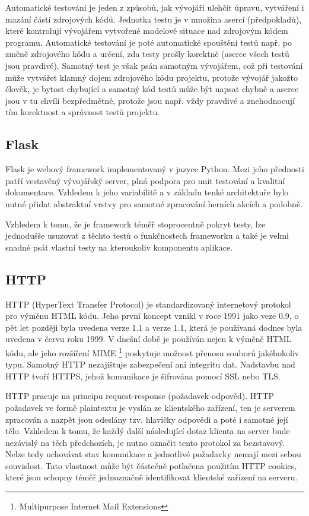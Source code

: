 \documentclass[16pt,titlepage,a4paper]{article}
\begin{document}
Automatické testování je jeden z způsobů, jak vývojáři ulehčit úpravu, vytváření i mazání částí zdrojových kódů. Jednotka testu je v množina asercí (předpokladů), které kontrolují vývojářem vytvořené modelové situace nad zdrojovým kódem programu. Automatické testování je poté automatické spouštění testů např. po změně zdrojového kódu a určení, zda testy prošly korektně (aserce všech testů jsou pravdivé). Samotný test je však psán samotným vývojářem, což při testování může vytvářet klamný dojem  zdrojového kódu projektu, protože vývojář jakožto člověk, je bytost chybující a samotný kód testů může být napsat chybně a aserce jsou v tu chvíli bezpředmětné, protože jsou např. vždy pravdivé a znehodnocují tím korektnost  a správnost testů projektu.

\subsection{Flask}

Flask je webový framework implementovaný v jazyce Python. Mezi jeho přednosti patří vestavěný vývojářský server, plná podpora pro unit testování a kvalitní dokumentace. Vzhledem k jeho variabilitě a v základu tenké architektuře bylo nutné přidat abstraktní vrstvy pro samotné zpracování herních akcích a podobně.

Vzhledem k tomu, že je framework téměř stoprocentně pokryt testy, lze jednodušše usuzovat z těchto testů o funkčnostech frameworku a také je velmi snadné psát vlastní testy na kteroukoliv komponentu aplikace.
\subsection{HTTP}

HTTP (HyperText Transfer Protocol) je standardizovaný internetový protokol pro výměnu HTML kódu. Jeho první koncept vznikl v roce 1991 jako veze 0.9, o pět let později byla uvedena verze 1.1 a verze 1.1, která je používaná dodnes byla uvedena v červu roku 1999. V dnešní době je používán nejen k výměně HTML kódu, ale jeho rozšíření MIME \footnote{Multipurpose Internet Mail Extensions} poskytuje možnost přenosu souborů jakéhokoliv typu. Samotný HTTP nezajištuje zabezpečení ani integritu dat. Nadstavbu nad HTTP tvoří HTTPS, jehož komunikace je šifrována pomocí SSL nebo TLS.

HTTP pracuje na principu request-response (požadavek-odpověd). HTTP požadavek ve formě plaintextu je vyslán ze klientského zařízení, ten je serverem zpracován a nazpět jsou odeslány tzv. hlavičky odpovědi a poté i samotné její tělo. Vzhledem k tomu, že každý další následující dotaz klienta na server bude nezávislý na těch předchozích, je nutno označit tento protokol za bezstavový. Nelze tedy uchovávat stav komunikace a jednotlivé požadavky nemají mezi sebou souvislost. Tato vlastnost může být částečně potlačena použitím HTTP cookies, které jsou schopny téměř jednoznačně identifikovat klientské zařízení na serveru.
\end{document}
